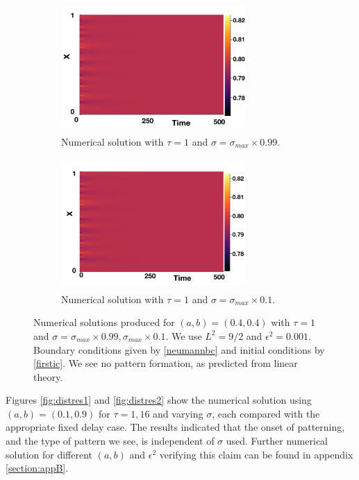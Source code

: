 \begin{figure}[H]
    \centering
    \begin{subfigure}[t]{0.45\textwidth}
        \centering
        \includegraphics[width=7cm,height=5cm]{distp2sig1.png}
        \caption{Numerical solution with $\tau=1$ and $\sigma=\sigma_{max}\times0.99$.}
        \label{}
    \end{subfigure}
    \hfill
    \begin{subfigure}[t]{0.45\textwidth}
        \centering
        \includegraphics[width=7cm,height=5cm]{distp2sig2.png}
        \caption{Numerical solution with $\tau=1$ and $\sigma=\sigma_{max}\times0.1$.}
        \label{}
    \end{subfigure}
    \caption{Numerical solutions produced for $(a,b)=(0.4,0.4)$ with $\tau=1$ and $\sigma=\sigma_{max}\times0.99, \sigma_{max}\times0.1$. We use $L^2=9/2$ and $\epsilon^2=0.001$. Boundary conditions given by \eqref{neumannbc} and initial conditions by \eqref{firstic}. We see no pattern formation, as predicted from linear theory.}
    \label{fig:testdist2}
\end{figure}
Figures \ref{fig:distres1} and \ref{fig:distres2} show the numerical solution using $(a,b)=(0.1,0.9)$ for $\tau=1,16$ and varying $\sigma$, each compared with the appropriate fixed delay case. The results indicated that the onset of patterning, and the type of pattern we see, is independent of $\sigma$ used. Further numerical solution for different $(a,b)$ and $\epsilon^2$ verifying this claim can be found in appendix \ref{section:appB}.

